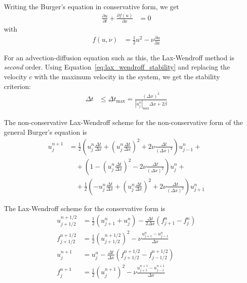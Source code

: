 \documentclass[twocolumn]{myarticle}
\begin{document}
Writing the Burger's equation in conservative form, we get
\begin{align}
    \frac{\partial u}{\partial t} + \frac{\partial f(u)}{\partial x} &= 0
\end{align}
with
\begin{align}
    f(u, \nu) &= \frac{1}{2} u^2 - \nu \frac{\partial u}{\partial x}
\end{align}

For an advection-diffusion equation such as this, the Lax-Wendroff method is \emph{second} order.
Using Equation~\ref{eq:lax_wendroff_stability} and replacing the velocity $ c $ with the maximum velocity in the system, we get the stability criterion:
\begin{align}
    \Delta t &\leq \Delta t_\text{max} = \frac{(\Delta x)^2}{|u_j^n|_\text{max} \Delta x + 2 \beta}
\end{align}

The non-conservative Lax-Wendroff scheme for the non-conservative form of the general Burger's equation is
\begin{align}
    u^{n+1}_j &= \frac{1}{2} \left( u^n_j \frac{\Delta t}{\Delta x} + \left( u^n_j \frac{\Delta t}{\Delta x} \right)^2 + 2 \nu \frac{\Delta t}{(\Delta x)^2} \right) u^n_{j-1} + \nonumber
    \\ 
    & \quad + \left( 1 -  \left( u^n_j \frac{\Delta t}{\Delta x} \right)^2  - 2 \nu \frac{\Delta t}{(\Delta x)^2} \right) u^n_j + \nonumber
    \\ 
    & \quad + \frac{1}{2} \left( -u^n_j \frac{\Delta t}{\Delta x} + \left( u^n_j \frac{\Delta t}{\Delta x} \right)^2 + 2 \nu \frac{\Delta t}{(\Delta x)^2} \right) u^n_{j+1}
\end{align}

The Lax-Wendroff scheme for the conservative form is
\begin{align}
    u^{n+1/2}_{j+1/2} &= \frac{1}{2} \left( u^n_{j+1} + u^n_{j} \right) - \frac{\Delta t}{2 \Delta x} \left( f^n_{j+1} - f^n_{j} \right)
    \\
    f^{n+1/2}_{j+1/2} &= \frac{1}{2} \left( u^{n+1/2}_{j+1/2} \right)^2 - \nu \frac{u^n_{j+1} - u^n_{j-1}}{\Delta x}
    \\
    u^{n+1}_j &= u^n_j - \frac{\Delta t}{\Delta x} \left( f^{n+1/2}_{j+1/2} - f^{n+1/2}_{j-1/2} \right)
    \\
    f^{n+1}_j &= \frac{1}{2} \left( u^{n+1}_j \right)^2 - \nu \frac{u^{n+1}_{j+1} - u^{n+1}_{j-1}}{\Delta x}
\end{align}
\end{document}
